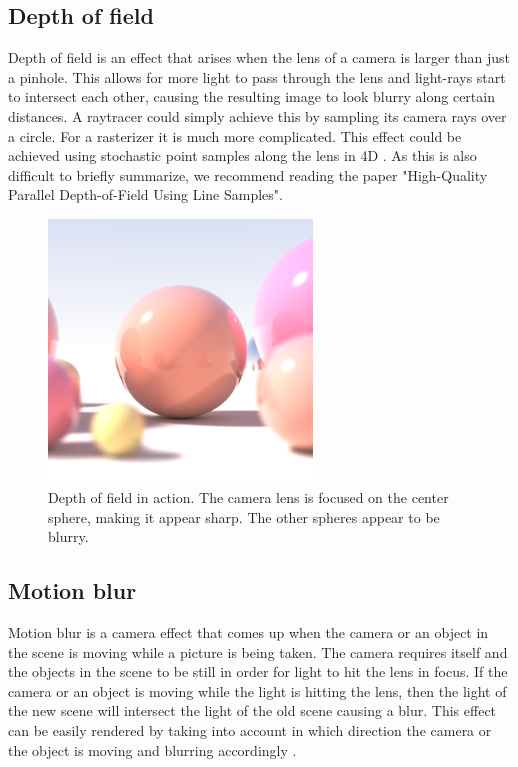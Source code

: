 \documentclass{ACGSeminar}
\begin{document}
	\subsection{Depth of field}
		Depth of field is an effect that arises when the lens of a camera is larger than just a pinhole. This allows for more light to pass through the lens and light-rays start to intersect each other, causing the resulting image to look blurry along certain distances. A raytracer could simply achieve this by sampling its camera rays over a circle. For a rasterizer it is much more complicated. This effect could be achieved using stochastic point samples along the lens in 4D \cite{DOF2}. As this is also difficult to briefly summarize, we recommend reading the paper "High-Quality Parallel Depth-of-Field Using Line Samples". 
		\begin{figure}[htb!]%
			\begin{center}%
				\includegraphics[width=7cm]{img/raytraced_depth_of_field.png}
			\end{center}%
			\caption{Depth of field in action. The camera lens is focused on the center sphere, making it appear sharp. The other spheres appear to be blurry.}%
			\label{fig:depth_of_field}%
		\end{figure}%

	\subsection{Motion blur}
		Motion blur is a camera effect that comes up when the camera or an object in the scene is moving while a picture is being taken. The camera requires itself and the objects in the scene to be still in order for light to hit the lens in focus. If the camera or an object is moving while the light is hitting the lens, then the light of the new scene will intersect the light of the old scene causing a blur. This effect can be easily rendered by taking into account in which direction the camera or the object is moving and blurring accordingly \cite{MOB}.
\end{document}
